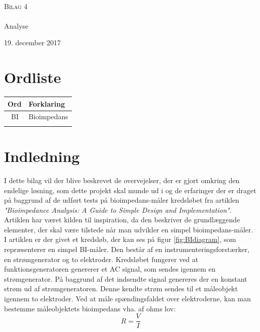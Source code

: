 



\begin{titlingpage}
\begin{center}

~ \\[3cm]


\textsc{\LARGE Bilag 4}\\[1.5cm]


\noindent\makebox[\linewidth]{\rule{\textwidth}{0.4pt}}\\
[0.5cm]{\Huge Analyse}
\noindent\makebox[\linewidth]{\rule{\textwidth}{0.4pt}}
\end{center}
\vfill
\begin{center}
{\large 19. december 2017}
\end{center}
\end{titlingpage}



\newpage
\tableofcontents*
\newpage
\chapter{Ordliste}

\begin{longtabu} to 
    Ord &    Forklaring\\
    \toprule \
   BI 	&    Bioimpedans \\
    
 
\label{forkort}
\end{longtabu}

\chapter{Indledning}

I dette bilag vil der blive beskrevet de overvejelser, der er gjort omkring den endelige løsning, som dette projekt skal munde ud i og de erfaringer der er draget på baggrund af de udført tests på bioimpedans-måler kredsløbet fra artiklen \textit{"Bioimpedance Analysis: A Guide to Simple Design and Implementation"}. Artiklen har været kilden til inspiration, da den beskriver de grundlæggende elementer, der skal være tilstede når man udvikler en simpel bioimpedans-måler. I artiklen er der givet et kredsløb, der kan ses på figur \ref{fig:BIdiagram}, som repræsenterer en simpel BI-måler. Den består af en instrumenteringsforstærker, en strømgenerator og to elektroder. Kredsløbet fungerer ved at funktionsgeneratoren genererer et AC signal, som sendes igennem en strømgenerator. På baggrund af det indsendte signal genereres der en konstant strøm ud af strømgeneratoren. Denne kendte strøm sendes til et måleobjekt igennem to elektroder. Ved at måle spændingsfaldet over elektroderne, kan man bestemme måleobjektets bioimpedans vha. af ohms lov: $$R=\frac{V}{I}$$

